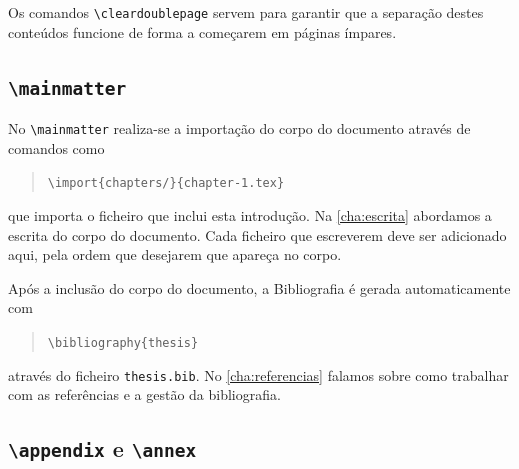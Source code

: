 Os comandos \texttt{\textbackslash cleardoublepage} servem para garantir que a separação destes conteúdos funcione de forma a começarem em páginas ímpares.

\subsection{\texttt{\textbackslash mainmatter}}
No \texttt{\textbackslash mainmatter} realiza-se a importação do corpo do documento através de comandos como
\begin{quote}
    \texttt{\textbackslash import\{chapters/\}\{chapter-1.tex\}}
\end{quote}
que importa o ficheiro que inclui esta introdução. Na \cref{cha:escrita} abordamos a escrita do corpo do documento. Cada ficheiro que escreverem deve ser adicionado aqui, pela ordem que desejarem que apareça no corpo.

Após a inclusão do corpo do documento, a Bibliografia é gerada automaticamente com
\begin{quote}
    \texttt{\textbackslash bibliography\{thesis\}}
\end{quote}
através do ficheiro \texttt{thesis.bib}. No \cref{cha:referencias} falamos sobre como trabalhar com as referências e a gestão da bibliografia.

\subsection{\texttt{\textbackslash appendix} e \texttt{\textbackslash annex}}


